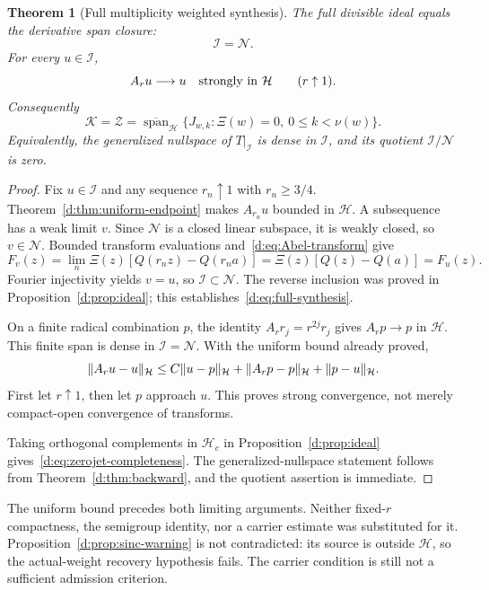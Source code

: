 \documentclass[11pt,a4paper]{article}
\numberwithin{equation}{section}
\newtheorem{theorem}{Theorem}[section]
\theoremstyle{definition}\newtheorem{definition}[theorem]{Definition}
\theoremstyle{remark}\newtheorem{remark}[theorem]{Remark}
\newcommand{\Hh}{\mathcal H}\newcommand{\Hw}{\mathcal H}
\newcommand{\Nn}{\mathcal N}\newcommand{\Ii}{\mathcal I}\newcommand{\Zz}{\mathcal Z}
\newcommand{\Kk}{\mathcal K}\newcommand{\Aa}{\mathcal A}\newcommand{\Ff}{\mathcal F}
\newcommand{\cl}{\overline{\operatorname{span}}}\newcommand{\Ran}{\operatorname{Ran}}\newcommand{\HS}{\mathfrak S_2}
\begin{document}
\begin{theorem}[Full multiplicity weighted synthesis]\label{d:thm:full-synthesis}
The full divisible ideal equals the derivative span closure:
\begin{equation}\label{d:eq:full-synthesis}
 \Ii=\Nn.
\end{equation}
For every $u\in\Ii$,
\begin{equation}\label{d:eq:strong-Abel}
 A_ru\longrightarrow u\quad\hbox{strongly in }\Hh
 \qquad(r\uparrow1).
\end{equation}
Consequently
\begin{equation}\label{d:eq:zerojet-completeness}
 \Kk=\Zz
 =\cl_{\Hh}\{J_{w,k}:\Xi(w)=0,\ 0\le k<\nu(w)\}.
\end{equation}
Equivalently, the generalized nullspace of $T|_{\Ii}$ is dense in $\Ii$, and its quotient $\Ii/\Nn$ is zero.
\end{theorem}
\begin{proof}
Fix $u\in\Ii$ and any sequence $r_n\uparrow1$ with $r_n\ge3/4$. Theorem~\ref{d:thm:uniform-endpoint} makes $A_{r_n}u$ bounded in $\Hh$. A subsequence has a weak limit $v$. Since $\Nn$ is a closed linear subspace, it is weakly closed, so $v\in\Nn$. Bounded transform evaluations and~\eqref{d:eq:Abel-transform} give
\[
 F_v(z)=\lim_n\Xi(z)[Q(r_nz)-Q(r_na)]
       =\Xi(z)[Q(z)-Q(a)]=F_u(z).
\]
Fourier injectivity yields $v=u$, so $\Ii\subset\Nn$. The reverse inclusion was proved in Proposition~\ref{d:prop:ideal}; this establishes~\eqref{d:eq:full-synthesis}.

On a finite radical combination $p$, the identity $A_rr_j=r^{2j}r_j$ gives $A_rp\to p$ in $\Hh$. This finite span is dense in $\Ii=\Nn$. With the uniform bound already proved,
\[
 \norm{A_ru-u}_{\Hh}
 \le C\norm{u-p}_{\Hh}
       +\norm{A_rp-p}_{\Hh}+\norm{p-u}_{\Hh}.
\]
First let $r\uparrow1$, then let $p$ approach $u$. This proves strong convergence, not merely compact-open convergence of transforms.

Taking orthogonal complements in $\Hh_c$ in Proposition~\ref{d:prop:ideal} gives~\eqref{d:eq:zerojet-completeness}. The generalized-nullspace statement follows from Theorem~\ref{d:thm:backward}, and the quotient assertion is immediate.
\end{proof}

The uniform bound precedes both limiting arguments. Neither fixed-$r$ compactness, the semigroup identity, nor a carrier estimate was substituted for it. Proposition~\ref{d:prop:sinc-warning} is not contradicted: its source is outside $\Hh$, so the actual-weight recovery hypothesis fails. The carrier condition is still not a sufficient admission criterion.
\end{document}
